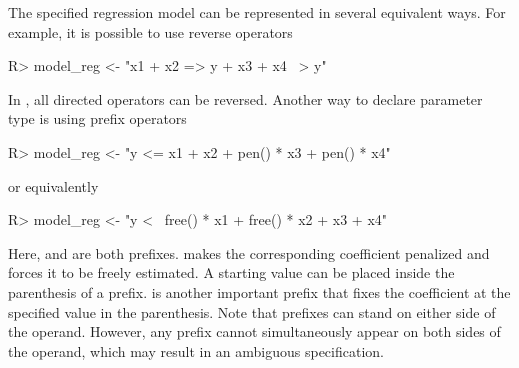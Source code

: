 \documentclass[nojss]{jss}
\begin{document}
The specified regression model can be represented in several equivalent ways. For example, it is possible to use reverse operators
\begin{Schunk}
\begin{Sinput}
R> model_reg <- "x1 + x2 => y
+                x3 + x4 ~> y"
\end{Sinput}
\end{Schunk}
In , all directed operators can be reversed. Another way to declare parameter type is using prefix operators
\begin{Schunk}
\begin{Sinput}
R> model_reg <- "y <= x1 + x2 + pen() * x3 + pen() * x4"
\end{Sinput}
\end{Schunk}
or equivalently
\begin{Schunk}
\begin{Sinput}
R> model_reg <- "y <~ free() * x1 + free() * x2 + x3 + x4"
\end{Sinput}
\end{Schunk}
Here,  and  are both prefixes.  makes the corresponding coefficient penalized and  forces it to be freely estimated. A starting value can be placed inside the parenthesis of a prefix.  is another important prefix that fixes the coefficient at the specified value in the parenthesis. Note that prefixes can stand on either side of the operand. However, any prefix cannot simultaneously appear on both sides of the operand, which may result in an ambiguous specification.
\end{document}

